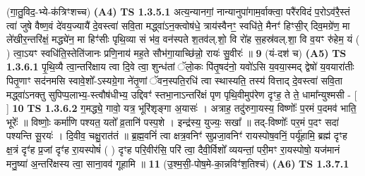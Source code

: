 \documentclass[17pt]{extarticle}
\begin{document}
                  \newline
                      (गा॒तु॒विद॒-भ्ये-क॑त्रिꣳशच्च)  \textbf{(A4)} \newline \newline
                                        \textbf{ TS 1.3.5.1} \newline
                  अत्य॒न्यानगां॒ नान्यानुपा॑गाम॒र्वाक्त्वा॒ परै॑रविदं प॒रोऽव॑रै॒स्तं त्वा॑ जुषे वैष्ण॒वं दे॑वय॒ज्यायै॑ दे॒वस्त्वा॑ सवि॒ता मद्ध्वा॑ऽन॒क्त्वोष॑धे॒ त्राय॑स्वैनꣳ॒॒ स्वधि॑ते॒ मैनꣳ॑ हिꣳसी॒र् दिव॒मग्रे॑ण॒ मा ले॑खीर॒न्तरि॑क्षं॒ मद्ध्ये॑न॒ मा हिꣳ॑सीः पृथि॒व्या सं भ॑व॒ वन॑स्पते श॒तव॑ल्.शो॒ वि रो॑ह स॒हस्र॑वल्.शा॒ वि व॒यꣳ रु॑हेम॒ यं ( ) त्वा॒ऽयꣳ स्वधि॑ति॒स्तेति॑जानः प्रणि॒नाय॑ मह॒ते सौभ॑गा॒याच्छि॑न्नो॒ रायः॑ सु॒वीरः॑ ॥ \textbf{  9 } \newline
                  \newline
                      (यं-दश॑ च)  \textbf{(A5)} \newline \newline
                                        \textbf{ TS 1.3.6.1} \newline
                  पृ॒थि॒व्यै त्वा॒न्तरि॑क्षाय त्वा दि॒वे त्वा॒ शुन्ध॑तां ॅलो॒कः पि॑तृ॒षद॑नो॒ यवो॑ऽसि य॒वया॒स्मद् द्वेषो॑ य॒वयारा॑तीः पितृ॒णाꣳ सद॑नमसि स्वावे॒शो᳚-ऽस्यग्रे॒गा ने॑तृ॒णां ॅवन॒स्पति॒रधि॑ त्वा स्थास्यति॒ तस्य॑ वित्ताद् दे॒वस्त्वा॑ सवि॒ता मद्ध्वा॑ऽनक्तु सुपिप्प॒लाभ्य॒-स्त्वौष॑धीभ्य॒ उद्दिवꣳ॑ स्तभा॒नाऽन्तरि॑क्षं पृण पृथि॒वीमुप॑रेण दृꣳह॒ ते ते॒ धामा᳚न्युश्मसी - [ ] \textbf{  10} \newline
                  \newline
                                \textbf{ TS 1.3.6.2} \newline
                  ग॒मद्ध्ये॒ गावो॒ यत्र॒ भूरि॑शृङ्गा अ॒यासः॑ । अत्राह॒ तदु॑रुगा॒यस्य॒ विष्णोः᳚ प॒रमं प॒दमव॑ भाति॒ भूरेः᳚ ॥ विष्णोः॒ कर्मा॑णि पश्यत॒ यतो᳚ व्र॒तानि॑ पस्प॒शे । इन्द्र॑स्य॒ युज्यः॒ सखा᳚ ॥ तद्-विष्णोः᳚ पर॒मं प॒दꣳ सदा॑ पश्यन्ति सू॒रयः॑ । दि॒वीव॒ चक्षु॒रात॑तं ॥ ब्र॒ह्म॒वनिं॑ त्वा क्षत्र॒वनिꣳ॑ सुप्रजा॒वनिꣳ॑ रायस्पोष॒वनिं॒ पर्यू॑हामि॒ ब्रह्म॑ दृꣳह क्ष॒त्रं दृꣳ॑ह प्र॒जां दृꣳ॑ह रा॒यस्पोषं॑ ( ) दृꣳह परि॒वीर॑सि॒ परि॑ त्वा॒ दैवी॒र्विशो᳚ व्ययन्तां॒ परी॒मꣳ रा॒यस्पोषो॒ यज॑मानं मनु॒ष्या॑ अ॒न्तरि॑क्षस्य त्वा॒ साना॒वव॑ गूहामि ॥ \textbf{  11 } \newline
                  \newline
                      (उ॒श्म॒सी॒-पोष॒मे-का॒न्नविꣳ॑श॒तिश्च॑)  \textbf{(A6)} \newline \newline
                                        \textbf{ TS 1.3.7.1} \newline
\end{document}
